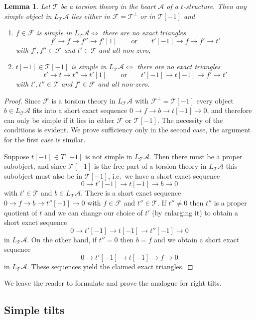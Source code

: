 \documentclass{article}
\theoremstyle{plain}
\newtheorem{lemma}[theorem]{Lemma}     %
\theoremstyle{definition}
\theoremstyle{remark}
\newcommand{\ie}{i.e.\ }
\newcommand{\cat}[1]{\mathcal{#1}}
\begin{document}
 \begin{lemma}
\label{simplicity criterion 1}
Let $\cat{T}$ be a torsion theory in the heart $\cat{A}$ of a $t$-structure. Then any simple object in $L_\cat{T}\cat{A}$ lies either in $\cat{F}=\cat{T}^\perp$ or in $\cat{T}[-1]$ and 
\begin{enumerate}
\item $f\in \cat{F}$ is simple in $L_\cat{T}\cat{A} \iff$ there are no exact triangles
$$
f'\to f\to f'' \to f'[1] \qquad \textrm{or} \qquad t'[-1] \to f\to f'\to t' 
$$
with $f',f''\in \cat{F}$ and $t'\in \cat{T}$ and all non-zero;
\item $t[-1] \in \cat{T}[-1]$ is simple in $L_\cat{T}\cat{A} \iff$ there are no exact triangles
$$
t'\to t\to t'' \to t'[1] \qquad \textrm{or} \qquad t'[-1]\to t[-1] \to f'\to t'
$$
 with $t',t''\in \cat{T}$ and $f'\in \cat{F}$ and all non-zero.
\end{enumerate}
\end{lemma}
\begin{proof}
Since $\cat{F}$ is a torsion theory in $L_\cat{T}\cat{A}$ with $\cat{F}^\perp = \cat{T}[-1]$ every object $b\in L_\cat{T}\cat{A}$ fits into a short exact sequence $0\to f \to b \to t[-1] \to 0$, and therefore can only be simple if it lies in either $\cat{F}$ or $\cat{T}[-1]$. The necessity of the conditions is evident. We  prove sufficiency only in the second case, the argument for the first case is similar. 

Suppose $t[-1]\in T[-1]$  is not simple in $L_\cat{T}\cat{A}$. Then there must be a proper subobject, and since $\cat{T}[-1]$ is the free part of a torsion theory in $L_\cat{T}\cat{A}$ this subobject must also be in $\cat{T}[-1]$, \ie we have a short exact sequence
$$
0\to t'[-1]\to t[-1] \to b\to 0
$$
 with $t'\in \cat{T}$ and $b\in L_\cat{T}\cat{A}$. There is a short exact sequence $0\to f \to b \to t''[-1]\to 0$ with $f\in \cat{F}$ and $t''\in\cat{T}$. If $t''\neq0$ then $t''$ is a proper quotient of $t$ and we can change our choice of $t'$ (by enlarging it) to obtain a short exact sequence
$$
0\to t'[-1]\to t[-1] \to t''[-1]\to 0
$$
in $L_\cat{T}\cat{A}$. On the other hand, if $t''=0$ then $b=f$ and we obtain a short exact sequence 
$$
0 \to t'[-1]\to t[-1]\to f\to 0
$$
in $L_\cat{T}\cat{A}$. These sequences yield the claimed exact triangles. 
\end{proof}
We leave the reader to formulate and prove the analogue for right tilts.



\subsection{Simple tilts}
\label{tilting at simples}
\end{document}

